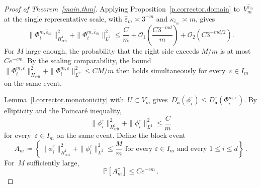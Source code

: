 \documentclass[11pt]{amsart}
\theoremstyle{plain}
\theoremstyle{definition}
\theoremstyle{remark}
\renewcommand{\a}{\mathbf{a}}
\newcommand{\eps}{\varepsilon}
\renewcommand{\P}{\mathbb{P}}
\begin{document}
\begin{proof}[Proof of Theorem~\ref{main.thm}]
		Applying Proposition~\ref{p.corrector.domain} to~$V_m^{\widehat\eps_m}$ at the single representative scale, with $\widehat\eps_m \asymp 3^{-m}$ and $\kappa_{\widehat\eps_m} \asymp m$, gives
		\begin{equation}
			\label{e.phi.enlarged}
			\|\Phi_i^{m,\widehat\eps_m}\|_{H^1_{\mathrm{crit}}}^2 + \|\Phi_i^{m,\widehat\eps_m}\|_{L^2}^2
			\le \frac{C}{m}
			+ \mathcal{O}_1\left(\frac{C 3^{-md}}{m}\right)
			+ \mathcal{O}_2\left(C 3^{-md/2}\right).
		\end{equation}
		For $M$ large enough, the probability that the right side exceeds $M/m$ is at most $Ce^{-cm}$.
		By the scaling comparability, the bound~$\|\Phi_i^{m,\eps}\|_{H^1_{\mathrm{crit}}}^2 + \|\Phi_i^{m,\eps}\|_{L^2}^2 \le CM/m$ then holds simultaneously for every~$\eps \in I_m$ on the same event.
		
		Lemma~\ref{l.corrector.monotonicity} with~$U \subset V_m^\eps$ gives~$D_\a^\eps(\phi_i^\eps) \le D_\a^\eps(\Phi_i^{m,\eps})$.
		By ellipticity and the Poincar\'e inequality,
		\begin{equation}
			\label{e.phi.block}
			\|\phi_i^\eps\|_{H^1_{\mathrm{crit}}}^2 + \|\phi_i^\eps\|_{L^2}^2
			\le \frac{C}{m}
		\end{equation}
		for every~$\eps \in I_m$ on the same event.
		Define the block event
		\[
		A_m \coloneqq \left\{
		\|\phi_i^\eps\|_{H^1_{\mathrm{crit}}}^2 + \|\phi_i^\eps\|_{L^2}^2 \le \frac{M}{m}
		\text{ for every } \eps \in I_m \text{ and every } 1 \le i \le d
		\right\}\,.
		\]
		For~$M$ sufficiently large,
		\begin{equation}
			\label{e.Am.fail}
			\P[A_m^c] \le Ce^{-cm}\,.
		\end{equation}
		
		\smallskip
		

\end{proof}
\end{document}

